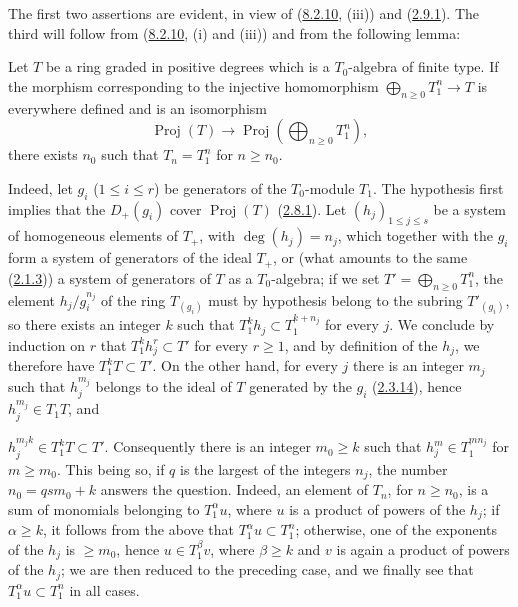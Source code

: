 The first two assertions are evident, in view of
(\hyperref[II.8.2.10]{8.2.10}, (iii)) and
(\hyperref[II.2.9.1]{2.9.1}). The third will follow from
(\hyperref[II.8.2.10]{8.2.10}, (i) and (iii)) and from the following lemma:

\begin{lemma}[8.2.14.1]
\label{II.8.2.14.1}
Let $T$ be a ring graded in positive degrees which is a $T_0$-algebra of finite
type. If the morphism corresponding to the injective homomorphism
$\bigoplus_{n\geq0}T_1^n\to T$ is everywhere defined and is an isomorphism
\[
  \operatorname{Proj}(T)\to
  \operatorname{Proj}\left(\bigoplus_{n\geq0}T_1^n\right),
\]
there exists $n_0$ such that $T_n=T_1^n$ for $n\geq n_0$.
\end{lemma}

Indeed, let $g_i$ ($1\leq i\leq r$) be generators of the $T_0$-module
$T_1$. The hypothesis first implies that the $D_+(g_i)$ cover
$\operatorname{Proj}(T)$ (\hyperref[II.2.8.1]{2.8.1}). Let
$(h_j)_{1\leq j\leq s}$ be a system of homogeneous elements of $T_+$, with
$\deg(h_j)=n_j$, which together with the $g_i$ form a system of generators of
the ideal $T_+$, or (what amounts to the same
(\hyperref[II.2.1.3]{2.1.3})) a system of generators of $T$ as a
$T_0$-algebra; if we set $T'=\bigoplus_{n\geq0}T_1^n$, the element
$h_j/g_i^{n_j}$ of the ring $T_{(g_i)}$ must by hypothesis belong to the
subring $T'_{(g_i)}$, so there exists an integer $k$ such that
$T_1^k h_j\subset T_1^{k+n_j}$ for every $j$. We conclude by induction
on $r$ that $T_1^k h_j^r\subset T'$ for every $r\geq1$, and by definition of the
$h_j$, we therefore have $T_1^kT\subset T'$. On the other hand, for every $j$
there is an integer $m_j$ such that $h_j^{m_j}$ belongs to the ideal of $T$ generated by
the $g_i$ (\hyperref[II.2.3.14]{2.3.14}), hence $h_j^{m_j}\in T_1T$, and

$h_j^{m_jk}\in T_1^kT\subset T'$. Consequently there is an integer $m_0\geq k$ such
that $h_j^m\in T_1^{mn_j}$ for $m\geq m_0$. This being so, if $q$ is the
largest of the integers $n_j$, the number $n_0=qsm_0+k$ answers the question.
Indeed, an element of $T_n$, for $n\geq n_0$, is a sum of monomials belonging
to $T_1^\alpha u$, where $u$ is a product of powers of the $h_j$; if
$\alpha\geq k$, it follows from the above that $T_1^\alpha u\subset T_1^n$;
otherwise, one of the exponents of the $h_j$ is $\geq m_0$, hence
$u\in T_1^\beta v$, where $\beta\geq k$ and $v$ is again a product of
powers of the $h_j$; we are then reduced to the preceding case, and we
finally see that $T_1^\alpha u\subset T_1^n$ in all cases.

